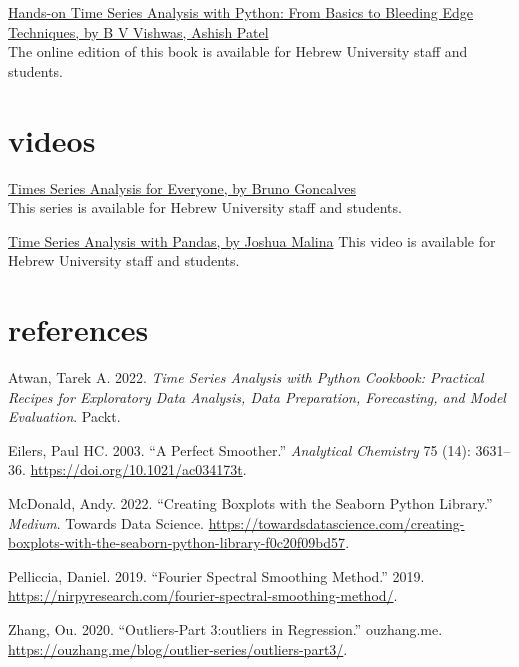 \documentclass[
  letterpaper,
  DIV=11,
  numbers=noendperiod,
  oneside]{scrreprt}
\newlength{\cslhangindent}
\newlength{\cslentryspacingunit} %
\newenvironment{CSLReferences}[2] %
 {%
  \setlength{\parindent}{0pt}
  \ifodd #1
  \let\oldpar\par
  \def\par{\hangindent=\cslhangindent\oldpar}
  \fi
  \setlength{\parskip}{#2\cslentryspacingunit}
 }%
 {}
\begin{document}
\href{https://huji.primo.exlibrisgroup.com/permalink/972HUJI_INST/10ptda2/alma9920845706703701}{Hands-on
Time Series Analysis with Python: From Basics to Bleeding Edge
Techniques, by B V Vishwas, Ashish Patel}\\
The online edition of this book is available for Hebrew University staff
and students.

\hypertarget{videos}{%
\section*{videos}\label{videos}}


\href{https://learning.oreilly.com/videos/times-series-analysis/9780136944515/}{Times
Series Analysis for Everyone, by Bruno Goncalves}\\
This series is available for Hebrew University staff and students.

\href{https://learning.oreilly.com/videos/time-series-analysis/00000G9DZPO7DJKE/}{Time
Series Analysis with Pandas, by Joshua Malina} This video is available
for Hebrew University staff and students.

\hypertarget{references}{%
\section*{references}\label{references}}


\hypertarget{refs}{}
\begin{CSLReferences}{1}{0}
\leavevmode{}%
Atwan, Tarek A. 2022. \emph{Time Series Analysis with Python Cookbook:
Practical Recipes for Exploratory Data Analysis, Data Preparation,
Forecasting, and Model Evaluation}. Packt.

\leavevmode{}%
Eilers, Paul HC. 2003. {``A Perfect Smoother.''} \emph{Analytical
Chemistry} 75 (14): 3631--36. \url{https://doi.org/10.1021/ac034173t}.

\leavevmode{}%
McDonald, Andy. 2022. {``Creating Boxplots with the Seaborn Python
Library.''} \emph{Medium}. Towards Data Science.
\url{https://towardsdatascience.com/creating-boxplots-with-the-seaborn-python-library-f0c20f09bd57}.

\leavevmode{}%
Pelliccia, Daniel. 2019. {``Fourier Spectral Smoothing Method.''} 2019.
\url{https://nirpyresearch.com/fourier-spectral-smoothing-method/}.

\leavevmode{}%
Zhang, Ou. 2020. {``Outliers-Part 3:outliers in Regression.''}
ouzhang.me.
\url{https://ouzhang.me/blog/outlier-series/outliers-part3/}.

\end{CSLReferences}
\end{document}
